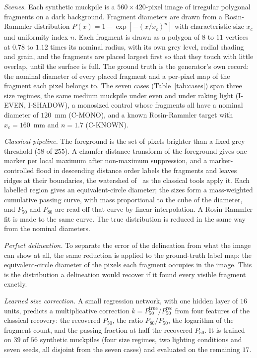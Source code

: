 \documentclass[journal]{IEEEtran}
\begin{document}
\emph{Scenes.} Each synthetic muckpile is a $560\times420$-pixel image of irregular polygonal fragments on a dark
background. Fragment diameters are drawn from a Rosin-Rammler distribution $P(x)=1-\exp[-(x/x_c)^n]$ with
characteristic size $x_c$ and uniformity index $n$. Each fragment is drawn as a polygon of $8$ to $11$ vertices at
$0.78$ to $1.12$ times its nominal radius, with its own grey level, radial shading and grain, and the fragments are
placed largest first so that they touch with little overlap, until the surface is full. The ground truth is the
generator's own record: the nominal diameter of every placed fragment and a per-pixel map of the fragment each pixel
belongs to. The seven cases (Table~\ref{tab:cases}) span three size regimes, the same medium muckpile under even and
under raking light (I-EVEN, I-SHADOW), a monosized control whose fragments all have a nominal diameter of
$120$~mm (C-MONO), and a known Rosin-Rammler target with $x_c=160$~mm and $n=1.7$ (C-KNOWN).

\emph{Classical pipeline.} The foreground is the set of pixels brighter than a fixed grey threshold ($58$ of $255$).
A chamfer distance transform of the foreground gives one marker per local maximum after non-maximum suppression, and
a marker-controlled flood in descending distance order labels the fragments and leaves ridges at their boundaries,
the watershed of~\cite{vincent} as the classical tools apply it. Each labelled region gives an equivalent-circle
diameter; the sizes form a mass-weighted cumulative passing curve, with mass proportional to the cube of the
diameter, and $P_{50}$ and $P_{80}$ are read off that curve by linear interpolation. A Rosin-Rammler fit is made to
the same curve. The true distribution is reduced in the same way from the nominal diameters.

\emph{Perfect delineation.} To separate the error of the delineation from what the image can show at all, the same
reduction is applied to the ground-truth label map: the equivalent-circle diameter of the pixels each fragment
occupies in the image. This is the distribution a delineation would recover if it found every visible fragment
exactly.

\emph{Learned size correction.} A small regression network, with one hidden layer of $16$ units, predicts a
multiplicative correction $k=P_{50}^{\mathrm{true}}/P_{50}^{\mathrm{rec}}$ from four features of the classical
recovery: the recovered $P_{50}$, the ratio $P_{80}/P_{50}$, the logarithm of the fragment count, and the passing
fraction at half the recovered $P_{50}$. It is trained on $39$ of $56$ synthetic muckpiles (four size regimes, two
lighting conditions and seven seeds, all disjoint from the seven cases) and evaluated on the remaining $17$.
\end{document}
